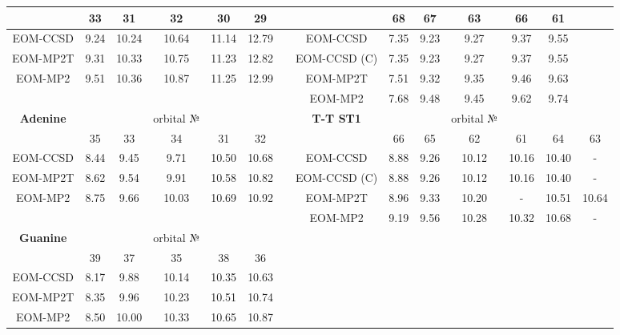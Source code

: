 \documentclass[12pt,nofootinbib]{revtex4}
\begin{document}
\begin{table}[!htbp]
\begin{tabular}{c|ccccc|c|c|cccccc}
    & 33    & 31    & 32    & 30    & 29  &   & & 68    & 67    & 63    & 66    & 61    &  \\
    \hline
    EOM-CCSD & 9.24  & 10.24 & 10.64 & 11.14 & 12.79 & & EOM-CCSD & 7.35  & 9.23  & 9.27  & 9.37  & 9.55  &        \\
    EOM-MP2T & 9.31  & 10.33 & 10.75 & 11.23 & 12.82 &  & EOM-CCSD (C) & 7.35  & 9.23  & 9.27  & 9.37  & 9.55  &        \\
    EOM-MP2 & 9.51  & 10.36 & 10.87 & 11.25 & 12.99 &   & EOM-MP2T & 7.51  & 9.32  & 9.35  & 9.46  & 9.63  &      \\
          &       &       &       &       &       &      & EOM-MP2 & 7.68  & 9.48  & 9.45  & 9.62  & 9.74  &  \\
    \hline
    \textbf{Adenine}  &       &       & orbital № &       &       &     &\textbf{T-T ST1}  &       &       & orbital № &       &       &       \\
    & 35    & 33    & 34    & 31    & 32    &     &  & 66    & 65    & 62    & 61    & 64    & 63 \\   
    \hline
    EOM-CCSD & 8.44  & 9.45  & 9.71  & 10.50 & 10.68 &       &       EOM-CCSD & 8.88  & 9.26  & 10.12 & 10.16 & 10.40 & -  \\
    EOM-MP2T & 8.62  & 9.54  & 9.91  & 10.58 & 10.82 &  & EOM-CCSD (C) & 8.88  & 9.26  & 10.12 & 10.16 & 10.40 & - \\
    EOM-MP2 & 8.75  & 9.66  & 10.03 & 10.69 & 10.92 &  
    & EOM-MP2T & 8.96  & 9.33  & 10.20 & -     & 10.51 & 10.64  \\
    &&&&&& & EOM-MP2 & 9.19  & 9.56  & 10.28 & 10.32 & 10.68 & - \\
    \hline
    \textbf{Guanine}  &       &       & orbital № &       &       &         &       &       &       &       &       &       &     \\ 
    & 39    & 37    & 35    & 38    & 36    & &       &       &       &       &       &       &               \\
    \hline
    EOM-CCSD & 8.17  & 9.88  & 10.14 & 10.35 & 10.63 & &       &       &       &       &       &       &              \\
    EOM-MP2T & 8.35  & 9.96  & 10.23 & 10.51 & 10.74 &       &       &       &       &       &       &       &  \\
    EOM-MP2 & 8.50  & 10.00 & 10.33 & 10.65 & 10.87 &       &       &       &       &       &       &       &  \\
    \hline\hline
    \end{tabular}%
  \label{tab:eom-ip-values}%
\end{table}%
\end{document}
